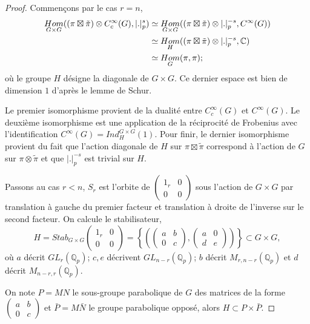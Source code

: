 \documentclass{amsart}
\DeclareMathOperator{\Hom}{\mathnormal{Hom}}
\begin{document}
\begin{proof}

Commençons par le cas $r=n$,
\begin{align}
\Hom_{G \times G}( (\pi \boxtimes \tilde{\pi}) \otimes C_c^\infty(G), |.|_p^s) &\simeq \Hom_{G \times G}( (\pi \boxtimes \tilde{\pi}) \otimes |.|_p^{-s}, C^\infty(G)) \\
&\simeq \Hom_H( (\pi \boxtimes \tilde{\pi}) \otimes |.|_p^{-s}, \mathbb{C}) \\
&\simeq \Hom_G(\pi, \pi);
\end{align}
où le groupe $H$ désigne la diagonale de $G \times G$. Ce dernier espace est bien de dimension $1$ d'après le lemme de Schur.

Le premier isomorphisme provient de la dualité entre $C_c^\infty(G)$ et $C^\infty(G)$. Le deuxième isomorphisme est une application de la réciprocité de Frobenius avec l'identification $C^\infty(G) = Ind_H^{G \times G}(1)$. Pour finir, le dernier isomorphisme provient du fait que l'action diagonale de $H$ sur $\pi \boxtimes \tilde{\pi}$ correspond à l'action de $G$ sur $\pi \otimes \tilde{\pi}$ et que $|.|_p^{-s}$ est trivial sur $H$.

Passons au cas $r < n$, $S_r$ est l'orbite de $\begin{pmatrix} 
1_r & 0 \\
0 & 0 
\end{pmatrix}$ sous l'action de $G \times G$ par translation à gauche du premier facteur et translation à droite de l'inverse sur le second facteur. On calcule le stabilisateur,
\begin{equation}
H = Stab_{G \times G} \begin{pmatrix} 
1_r & 0 \\
0 & 0 
\end{pmatrix} = \left\lbrace \left(\begin{pmatrix} 
a & b \\
0 & c 
\end{pmatrix}, \begin{pmatrix} 
a & 0 \\
d & e 
\end{pmatrix} \right) \right\rbrace \subset G \times G,
\end{equation}
où $a$ décrit $GL_r(\mathbb{Q}_p)$; $c, e$ décrivent $GL_{n-r}(\mathbb{Q}_p)$; $b$ décrit $M_{r,n-r}(\mathbb{Q}_p)$ et $d$ décrit $M_{n-r,r}(\mathbb{Q}_p)$.
 
On note $P = MN$ le sous-groupe parabolique de $G$ des matrices de la forme $\begin{pmatrix} 
a & b \\
0 & c 
\end{pmatrix}$ et $\bar{P} = M\bar{N}$ le groupe parabolique opposé, alors $H \subset P \times \bar{P}$.


\end{proof}
\end{document}
